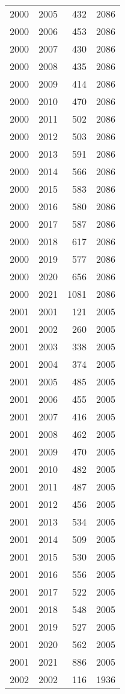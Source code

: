 \documentclass[
  10pt,
  letterpaper,
  DIV=11,
  numbers=noendperiod,
  twoside]{scrartcl}
\begin{document}
\begin{longtable}[]{@{}rrrr@{}}
2000 & 2005 & 432 & 2086 \\
2000 & 2006 & 453 & 2086 \\
2000 & 2007 & 430 & 2086 \\
2000 & 2008 & 435 & 2086 \\
2000 & 2009 & 414 & 2086 \\
2000 & 2010 & 470 & 2086 \\
2000 & 2011 & 502 & 2086 \\
2000 & 2012 & 503 & 2086 \\
2000 & 2013 & 591 & 2086 \\
2000 & 2014 & 566 & 2086 \\
2000 & 2015 & 583 & 2086 \\
2000 & 2016 & 580 & 2086 \\
2000 & 2017 & 587 & 2086 \\
2000 & 2018 & 617 & 2086 \\
2000 & 2019 & 577 & 2086 \\
2000 & 2020 & 656 & 2086 \\
2000 & 2021 & 1081 & 2086 \\
2001 & 2001 & 121 & 2005 \\
2001 & 2002 & 260 & 2005 \\
2001 & 2003 & 338 & 2005 \\
2001 & 2004 & 374 & 2005 \\
2001 & 2005 & 485 & 2005 \\
2001 & 2006 & 455 & 2005 \\
2001 & 2007 & 416 & 2005 \\
2001 & 2008 & 462 & 2005 \\
2001 & 2009 & 470 & 2005 \\
2001 & 2010 & 482 & 2005 \\
2001 & 2011 & 487 & 2005 \\
2001 & 2012 & 456 & 2005 \\
2001 & 2013 & 534 & 2005 \\
2001 & 2014 & 509 & 2005 \\
2001 & 2015 & 530 & 2005 \\
2001 & 2016 & 556 & 2005 \\
2001 & 2017 & 522 & 2005 \\
2001 & 2018 & 548 & 2005 \\
2001 & 2019 & 527 & 2005 \\
2001 & 2020 & 562 & 2005 \\
2001 & 2021 & 886 & 2005 \\
2002 & 2002 & 116 & 1936 \\

\end{longtable}
\end{document}
